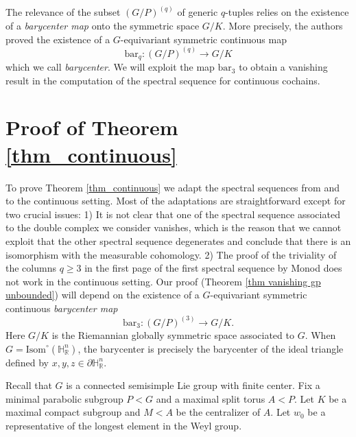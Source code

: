 \documentclass[a4paper]{amsart}
\theoremstyle{definition}
\theoremstyle{remark}
\theoremstyle{TheoremNum}
\begin{document}
The relevance of the subset $(G/P)^{(q)}$ of generic $q$-tuples relies on the existence of a \emph{barycenter map} onto the symmetric space $G/K$. More precisely, the authors \cite[Corollary 4]{BucSavProj} proved the existence of a $G$-equivariant symmetric continuous map
$$
\mathrm{bar}_q:(G/P)^{(q)} \longrightarrow G/K
$$
which we call \emph{barycenter}. We will exploit the map $\mathrm{bar}_3$ to obtain a vanishing result in the computation of the spectral sequence for continuous cochains. 

\section{Proof of Theorem \ref{thm_continuous}}\label{sec continuous theorem}

To prove Theorem \ref{thm_continuous} we adapt the spectral sequences from \cite{Monod} and \cite{BucSavAlt} to the continuous setting. Most of the adaptations are straightforward except for two crucial issues: 1) It is not clear that one of the spectral sequence associated to the double complex we consider vanishes, which is the reason that we cannot exploit that the other spectral sequence degenerates and conclude that there is an isomorphism with the  measurable cohomology. 2) The proof of the triviality of the columns $q\geq 3$ in the first page of the first spectral sequence by Monod \cite[Proposition 5.1]{Monod} does not work in the continuous setting. Our proof (Theorem \ref{thm vanishing gp unbounded}) will depend on the existence of  a $G$-equivariant symmetric continuous \emph{barycenter map} \cite{BucSavProj} 
\begin{equation}\label{eq intro bar 3}
\mathrm{bar}_3:(G/P)^{(3)} \rightarrow G/K.
\end{equation}
Here $G/K$ is the Riemannian globally symmetric space associated to $G$. When $G=\mathrm{Isom}^\circ(\mathbb{H}^n_\mathbb{R})$, the barycenter is precisely the barycenter of the ideal triangle defined by $x,y,z \in \partial \mathbb{H}^n_{\mathbb{R}}$. 

Recall that $G$ is a connected semisimple Lie group with finite center. Fix a
minimal parabolic subgroup $P<G$ and a maximal split torus $A<P$. Let $K$ be
a maximal compact subgroup and $M<A$ be the centralizer of $A$. Let $w_0$ be a
representative of the longest element in the Weyl group.
\end{document}
